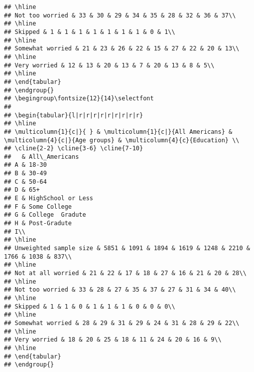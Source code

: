 \documentclass[
]{article}
\begin{document}
\begin{verbatim}
## \hline
## Not too worried & 33 & 30 & 29 & 34 & 35 & 28 & 32 & 36 & 37\\
## \hline
## Skipped & 1 & 1 & 1 & 1 & 1 & 1 & 1 & 0 & 1\\
## \hline
## Somewhat worried & 21 & 23 & 26 & 22 & 15 & 27 & 22 & 20 & 13\\
## \hline
## Very worried & 12 & 13 & 20 & 13 & 7 & 20 & 13 & 8 & 5\\
## \hline
## \end{tabular}
## \endgroup{}
## \begingroup\fontsize{12}{14}\selectfont
## 
## \begin{tabular}{l|r|r|r|r|r|r|r|r|r}
## \hline
## \multicolumn{1}{c|}{ } & \multicolumn{1}{c|}{All Americans} & \multicolumn{4}{c|}{Age groups} & \multicolumn{4}{c}{Education} \\
## \cline{2-2} \cline{3-6} \cline{7-10}
##   & All\_Americans
## A & 18-30
## B & 30-49
## C & 50-64
## D & 65+
## E & HighSchool or Less
## F & Some College
## G & College  Gradute
## H & Post-Gradute
## I\\
## \hline
## Unweighted sample size & 5851 & 1091 & 1894 & 1619 & 1248 & 2210 & 1766 & 1038 & 837\\
## \hline
## Not at all worried & 21 & 22 & 17 & 18 & 27 & 16 & 21 & 20 & 28\\
## \hline
## Not too worried & 33 & 28 & 27 & 35 & 37 & 27 & 31 & 34 & 40\\
## \hline
## Skipped & 1 & 1 & 0 & 1 & 1 & 1 & 0 & 0 & 0\\
## \hline
## Somewhat worried & 28 & 29 & 31 & 29 & 24 & 31 & 28 & 29 & 22\\
## \hline
## Very worried & 18 & 20 & 25 & 18 & 11 & 24 & 20 & 16 & 9\\
## \hline
## \end{tabular}
## \endgroup{}
\end{verbatim}
\end{document}

